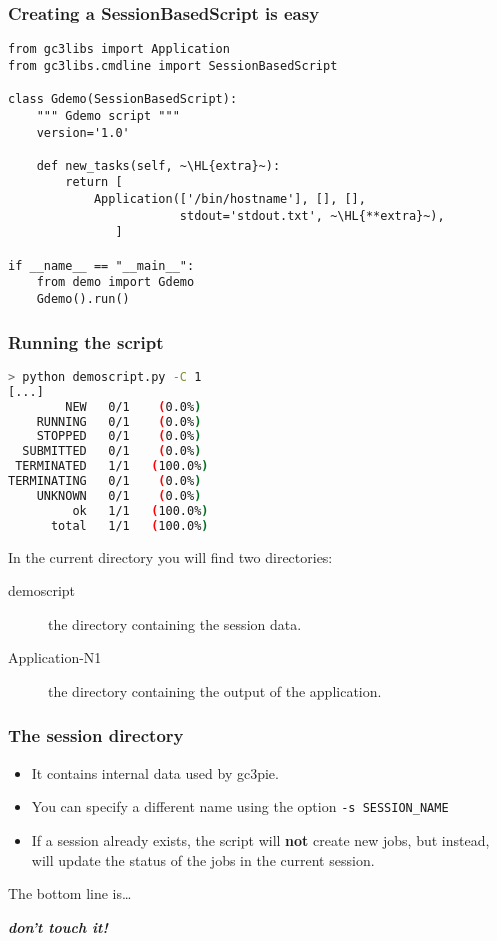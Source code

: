 \documentclass[english,serif,mathserif,xcolor=pdftex,dvipsnames,table]{beamer}
\begin{document}
\begin{frame}[fragile]
  \frametitle{Creating a SessionBasedScript is easy}
  \begin{lstlisting}
from gc3libs import Application
from gc3libs.cmdline import SessionBasedScript

class Gdemo(SessionBasedScript):
    """ Gdemo script """
    version='1.0'

    def new_tasks(self, ~\HL{extra}~):
        return [
            Application(['/bin/hostname'], [], [],
                        stdout='stdout.txt', ~\HL{**extra}~),
               ]

if __name__ == "__main__":
    from demo import Gdemo
    Gdemo().run()
  \end{lstlisting}
\end{frame}

\begin{frame}[fragile]
  \frametitle{Running the script}

  \begin{lstlisting}[language=sh]
> python demoscript.py -C 1
[...]
        NEW   0/1    (0.0%)
    RUNNING   0/1    (0.0%)
    STOPPED   0/1    (0.0%)
  SUBMITTED   0/1    (0.0%)
 TERMINATED   1/1   (100.0%)
TERMINATING   0/1    (0.0%)
    UNKNOWN   0/1    (0.0%)
         ok   1/1   (100.0%)
      total   1/1   (100.0%)
  \end{lstlisting}
  \pause
  \+

  In the current directory you will find two directories:
  \begin{description}
  \item[demoscript] the directory containing the session data.
  \item[Application-N1] the directory containing the output of the
    application.
  \end{description}
\end{frame}

\begin{frame}[fragile]
  \frametitle{The session directory}

  \begin{itemize}
  \item It contains internal data used by gc3pie.
  \item You can specify a different name using the option \lstinline|-s SESSION_NAME|
  \item If a session already exists, the script will \textbf{not} create
    new jobs, but instead, will update the status of the jobs in the
    current session.
  \end{itemize}

  The bottom line is\ldots

  \pause
  \begin{center}
    \textit{\textbf{don't touch it!}}
  \end{center}

\end{frame}
\end{document}

